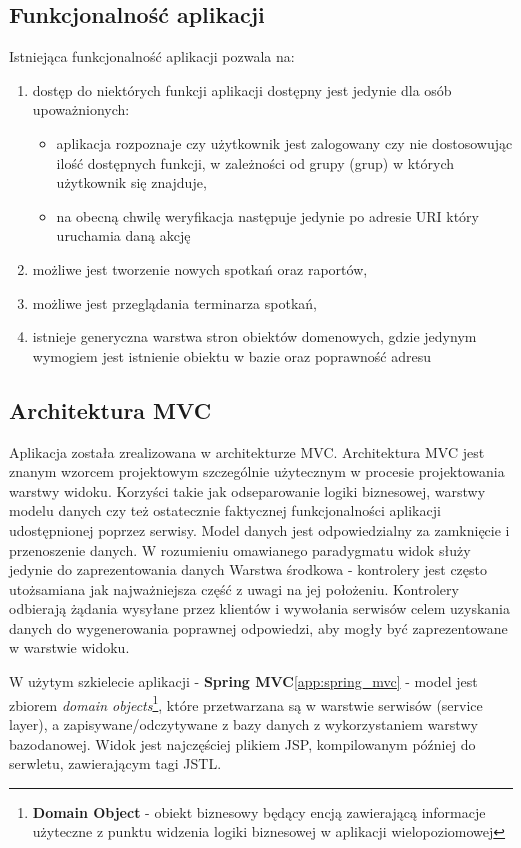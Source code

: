 	\subsection{Funkcjonalność aplikacji}
	Istniejąca funkcjonalność aplikacji pozwala na:
	\begin{enumerate}
		\item dostęp do niektórych funkcji aplikacji dostępny jest jedynie dla osób upoważnionych:
		\begin{itemize}
			\item aplikacja rozpoznaje czy użytkownik jest zalogowany czy nie dostosowując ilość dostępnych funkcji,
			w zależności od grupy (grup) w których użytkownik się znajduje,
			\item na obecną chwilę weryfikacja następuje jedynie po adresie URI który uruchamia daną akcję
		\end{itemize}
		\item możliwe jest tworzenie nowych spotkań oraz raportów,
		\item możliwe jest przeglądania terminarza spotkań,
		\item istnieje generyczna warstwa stron obiektów domenowych, gdzie jedynym wymogiem jest istnienie obiektu w bazie
		oraz poprawność adresu
	\end{enumerate}
		
	\subsection{Architektura MVC}
		Aplikacja została zrealizowana w architekturze MVC. Architektura MVC jest znanym wzorcem projektowym
		szczególnie użytecznym w procesie projektowania warstwy widoku. Korzyści takie jak odseparowanie logiki biznesowej,
		warstwy modelu danych czy też ostatecznie faktycznej funkcjonalności aplikacji udostępnionej poprzez serwisy. 
		Model danych jest odpowiedzialny za zamknięcie i przenoszenie danych. W rozumieniu omawianego paradygmatu widok służy
		jedynie do zaprezentowania danych Warstwa środkowa - kontrolery jest często utożsamiana jak najważniejsza część z uwagi
		na jej położeniu. Kontrolery odbierają żądania wysyłane przez klientów i wywołania serwisów celem uzyskania danych
		do wygenerowania poprawnej odpowiedzi, aby mogły być zaprezentowane w warstwie widoku\cite{spring_recipies}.
		
		W użytym szkielecie aplikacji - \textbf{Spring MVC}\ref{app:spring_mvc} - model jest zbiorem \textit{domain objects}\footnote{
		\textbf{Domain Object} - obiekt biznesowy będący encją zawierającą informacje użyteczne z punktu widzenia logiki biznesowej w 
		aplikacji wielopoziomowej}, które przetwarzana są w warstwie serwisów (service layer), a zapisywane/odczytywane z bazy danych
		z wykorzystaniem warstwy bazodanowej. Widok jest najczęściej plikiem JSP, kompilowanym później do serwletu, zawierającym
		tagi JSTL.
		
